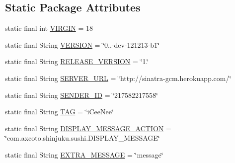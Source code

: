 \subsection*{\-Static \-Package \-Attributes}
\begin{DoxyCompactItemize}
\item 
static final int \hyperlink{classcom_1_1axcoto_1_1shinjuku_1_1sushi_1_1_common_utilities_a407e41a2127125cd417c1fc9a6e386d3}{\-V\-I\-R\-G\-I\-N} = 18
\item 
static final \-String \hyperlink{classcom_1_1axcoto_1_1shinjuku_1_1sushi_1_1_common_utilities_a105e560486f3a1da9e93f217457721f3}{\-V\-E\-R\-S\-I\-O\-N} = \char`\"{}0..-\/dev-\/121213-\/b1\char`\"{}
\item 
static final \-String \hyperlink{classcom_1_1axcoto_1_1shinjuku_1_1sushi_1_1_common_utilities_a72efe0777a0465abd0884b09c411522e}{\-R\-E\-L\-E\-A\-S\-E\-\_\-\-V\-E\-R\-S\-I\-O\-N} = \char`\"{}1.\char`\"{}
\item 
static final \-String \hyperlink{classcom_1_1axcoto_1_1shinjuku_1_1sushi_1_1_common_utilities_acd97eb519a94f326404d38eecc610827}{\-S\-E\-R\-V\-E\-R\-\_\-\-U\-R\-L} = \char`\"{}http\-://sinatra-\/gcm.\-herokuapp.\-com/\char`\"{}
\item 
static final \-String \hyperlink{classcom_1_1axcoto_1_1shinjuku_1_1sushi_1_1_common_utilities_aa840ce9801840253f450d1ef532a119b}{\-S\-E\-N\-D\-E\-R\-\_\-\-I\-D} = \char`\"{}217582217558\char`\"{}
\item 
static final \-String \hyperlink{classcom_1_1axcoto_1_1shinjuku_1_1sushi_1_1_common_utilities_a844c5efdea72aa6bf76fb98b1072572a}{\-T\-A\-G} = \char`\"{}i\-Cee\-Nee\char`\"{}
\item 
static final \-String \hyperlink{classcom_1_1axcoto_1_1shinjuku_1_1sushi_1_1_common_utilities_a660b2cbce60057020b6583343c22be93}{\-D\-I\-S\-P\-L\-A\-Y\-\_\-\-M\-E\-S\-S\-A\-G\-E\-\_\-\-A\-C\-T\-I\-O\-N} = \char`\"{}com.\-axcoto.\-shinjuku.\-sushi.\-D\-I\-S\-P\-L\-A\-Y\-\_\-\-M\-E\-S\-S\-A\-G\-E\char`\"{}
\item 
static final \-String \hyperlink{classcom_1_1axcoto_1_1shinjuku_1_1sushi_1_1_common_utilities_a52f7c94c47a3edf550c4a0ef62363432}{\-E\-X\-T\-R\-A\-\_\-\-M\-E\-S\-S\-A\-G\-E} = \char`\"{}message\char`\"{}
\end{DoxyCompactItemize}


